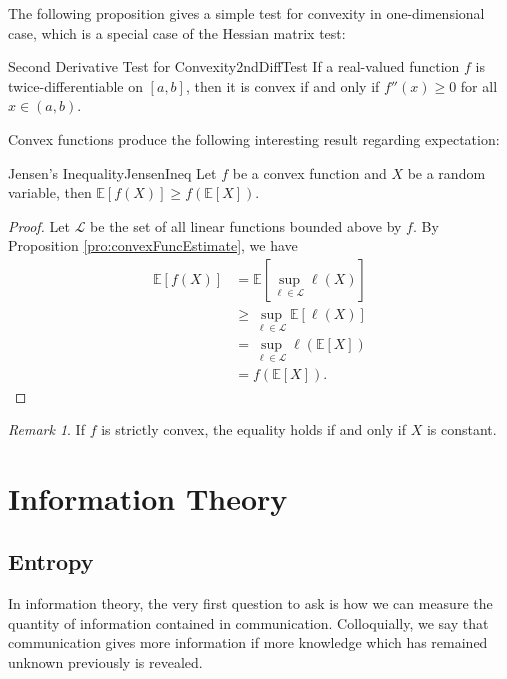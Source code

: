 \documentclass[math, code]{amznotes}
\theoremstyle{remark}
\newtheorem*{remark}{Remark}
\begin{document}
The following proposition gives a simple test for convexity in one-dimensional case, which is a special case of the Hessian matrix test:
\begin{probox}{Second Derivative Test for Convexity}{2ndDiffTest}
    If a real-valued function $f$ is twice-differentiable on $[a, b]$, then it is convex if and only if $f''\left(x\right) \geq 0$ for all $x \in \left(a, b\right)$.
\end{probox}
Convex functions produce the following interesting result regarding expectation:
\begin{thmbox}{Jensen's Inequality}{JensenIneq}
    Let $f$ be a convex function and $X$ be a random variable, then $\mathbb{E}[f\left(X\right)] \geq f\left(\mathbb{E}[X]\right)$.
    \tcblower
    \begin{proof}
        Let $\mathcal{L}$ be the set of all linear functions bounded above by $f$. By Proposition \ref{pro:convexFuncEstimate}, we have 
        \begin{align*}
            \mathbb{E}[f\left(X\right)] & = \mathbb{E}\left[\sup_{\ell \in \mathcal{L}}\ell\left(X\right)\right] \\
            & \geq \sup_{\ell \in \mathcal{L}}\mathbb{E}[\ell\left(X\right)] \\
            & = \sup_{\ell \in \mathcal{L}}\ell\left(\mathbb{E}[X]\right) \\
            & = f\left(\mathbb{E}[X]\right).
        \end{align*}
    \end{proof}
\end{thmbox}
\begin{notebox}
    \begin{remark}
        If $f$ is strictly convex, the equality holds if and only if $X$ is constant.
    \end{remark}
\end{notebox}
\chapter{Information Theory}
\section{Entropy}
In information theory, the very first question to ask is how we can measure the quantity of information contained in communication. Colloquially, we say that communication gives more information if more knowledge which has remained unknown previously is revealed.
\end{document}
